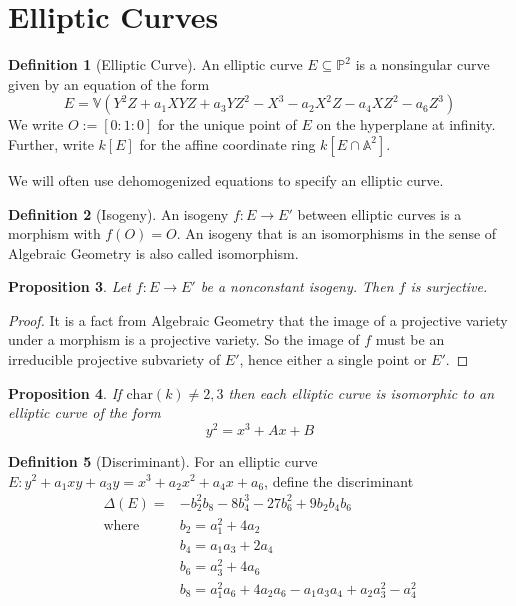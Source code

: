 \documentclass{scrartcl}
\newcommand{\V}{\mathbb{V}}
\newcommand{\Aff}{\mathbb{A}}
\newcommand{\Proj}{\mathbb{P}}
\renewcommand{\O}{O}
\newtheorem{prop}{Proposition}[section]
\theoremstyle{definition}
\newtheorem{definition}[prop]{Definition}
\begin{document}
\section{Elliptic Curves}

\begin{definition}[Elliptic Curve]
    An elliptic curve $E \subseteq \Proj^2$ is a nonsingular curve given by an equation of the form
    \begin{equation*}
        E = \V( Y^2 Z + a_1 XYZ + a_3 YZ^2 - X^3 - a_2 X^2 Z - a_4 XZ^2 - a_6 Z^3 )
    \end{equation*}
    We write $\O := [0 : 1 : 0]$ for the unique point of $E$ on the hyperplane at infinity.
    Further, write $k[E]$ for the affine coordinate ring $k[E \cap \Aff^2]$.
\end{definition}

We will often use dehomogenized equations to specify an elliptic curve.

\begin{definition}[Isogeny]
    An isogeny $f: E \to E'$ between elliptic curves is a morphism with $f(\O) = \O$.
    An isogeny that is an isomorphisms in the sense of Algebraic Geometry is also called isomorphism.
\end{definition}

\begin{prop}
    \label{prop:isogeny_surjective}
    Let $f: E \to E'$ be a nonconstant isogeny. 
    Then $f$ is surjective.
\end{prop}
\begin{proof}
    It is a fact from Algebraic Geometry that the image of a projective variety under a morphism is a projective variety.
    So the image of $f$ must be an irreducible projective subvariety of $E'$, hence either a single point or $E'$.
\end{proof}

\begin{prop}
    If $\mathrm{char}(k) \neq 2, 3$ then each elliptic curve is isomorphic to an elliptic curve of the form
    \begin{equation*}
        y^2 = x^3 + A x + B
    \end{equation*}
\end{prop}

\begin{definition}[Discriminant]
    For an elliptic curve $E: y^2 + a_1 xy + a_3 y = x^3 + a_2 x^2 + a_4 x + a_6$, define the discriminant
    \begin{align*}
        \Delta(E) = & - b_2^2 b_8 - 8 b_4^3 - 27 b_6^2 + 9 b_2 b_4 b_6 \\
        \text{where} \quad & b_2 = a_1^2 + 4 a_2 \\
        & b_4 = a_1 a_3 + 2 a_4 \\
        & b_6 = a_3^2 + 4 a_6 \\
        & b_8 = a_1^2 a_6 + 4 a_2 a_6 - a_1 a_3 a_4 + a_2 a_3^2 - a_4^2
    \end{align*}
\end{definition}
\end{document}
